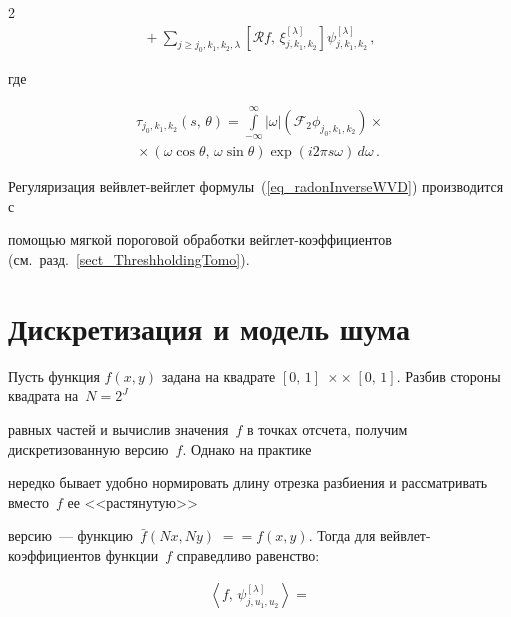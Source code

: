 \begin{multicols}{2}
\begin{multline}
{}+ \sum\limits_{j\geqslant j_0,k_1,k_2,\lambda} \left[\mathcal{R}f,\,\xi^{[\lambda]}_{j,k_1,k_2}\right] \psi^{[\lambda]}_{j,k_1,k_2}\,,


\label{eq_radonInverseWVD}


\end{multline}


где


\begin{multline*}


\tau_{j_0,k_1,k_2}(s,\,\theta)=\int\limits_{-\infty}^\infty|\omega|\left(\mathcal{F}_2\phi_{j_0,k_1,k_2}\right)\times{}\\


{}\times \left( \omega\cos\theta,\,\omega\sin\theta \right)


\exp\left(i2\pi s\omega\right)\,d\omega\,.


\end{multline*}


Регуляризация вейвлет-вейглет формулы~(\ref{eq_radonInverseWVD}) производится с 


помощью мягкой пороговой обработки вейглет-коэффициентов (см.\ разд.~\ref{sect_ThreshholdingTomo}).





\section{Дискретизация и модель шума}





Пусть функция $f(x,y)$ задана на квадрате $[0,\,1]\;\times$\linebreak $\times\;[0,\,1]$. Разбив стороны квадрата на~$N=2^J$ 


равных частей и вычислив значения~$f$ в точках отсчета, получим дискретизованную версию~$f$. Одна\-ко на практике 


нередко бывает удобно нормировать длину отрезка разбиения и рас\-сматривать вместо~$f$ ее <<растянутую>>


версию~--- функцию~$\bar f(Nx,Ny)\;=$\linebreak $={f}(x,y)$. Тогда для вейвлет-коэффициентов функции~$f$ справедливо равенство:


\begin{multline}


\left\langle f,\, \psi^{[\lambda]}_{j,u_1,u_2}\right\rangle ={}\\



\end{multline}
\end{multicols}
